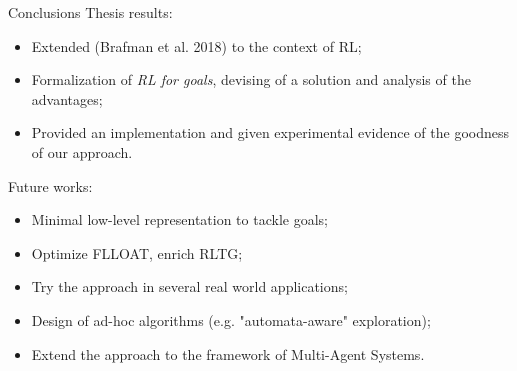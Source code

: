\documentclass{beamer}
\begin{document}
\begin{frame}{Conclusions}
	Thesis results:
	\begin{itemize}
		\item Extended (Brafman et al. 2018) to the context of RL;
		\item Formalization of \emph{RL for \LLf goals}, devising of a solution and analysis of the advantages;
		\item Provided an implementation and given experimental evidence of the goodness of our approach.
	\end{itemize}
	Future works:
	\begin{itemize}
		\item Minimal low-level representation to tackle \LLf goals;
		\item Optimize FLLOAT, enrich RLTG;
		\item Try the approach in several real world applications;
		\item Design of ad-hoc algorithms (e.g. "automata-aware" exploration);
		\item Extend the approach to the framework of Multi-Agent Systems.
	\end{itemize}
	
	
\end{frame}
\end{document}

